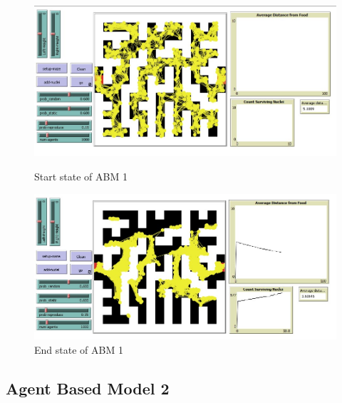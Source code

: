 \documentclass[a4paper, 12pt]{article}
\begin{document}
    \begin{figure}[h!]
        \centering
        \includegraphics[scale = 0.67]{Images/abm1_start.jpg}
        \caption{Start state of ABM 1}
        \label{fig:abm1start}
        \includegraphics[scale = 0.67]{Images/abm1_end.jpg}
        \caption{End state of ABM 1}
        \label{fig:abm1end}
    \end{figure}
    \newpage
\subsection{Agent Based Model 2}
    
\end{document}
